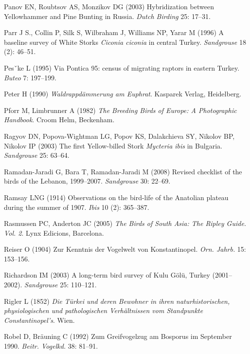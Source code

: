 \documentclass[
  letterpaper,
  DIV=11,
  numbers=noendperiod]{scrreprt}
\newlength{\cslhangindent}
\newenvironment{CSLReferences}[2] %
 {\begin{list}{}{%
  \setlength{\itemindent}{0pt}
  \setlength{\leftmargin}{0pt}
  \setlength{\parsep}{0pt}
  \ifodd #1
   \setlength{\leftmargin}{\cslhangindent}
   \setlength{\itemindent}{-1\cslhangindent}
  \fi
  \setlength{\itemsep}{#2\baselineskip}}}
 {\end{list}}
\begin{document}
\begin{CSLReferences}{0}{1}
Panov EN, Roubtsov AS, Monzikov DG (2003) {Hybridization between
Yellowhammer and Pine Bunting in Russia}. \emph{Dutch Birding} 25:
17--31.

Parr J S., Collin P, Silk S, Wilbraham J, Williams NP, Yarar M (1996) {A
baseline survey of White Storks \emph{Ciconia ciconia} in central
Turkey}. \emph{Sandgrouse} 18 (2): 46--51.

Pesˇke L (1995) {Via Pontica 95: census of migrating raptors in eastern
Turkey}. \emph{Buteo} 7: 197--199.

Peter H (1990) \emph{{Waldrappdämmerung am Euphrat}}. Kasparek Verlag,
Heidelberg.

Pforr M, Limbrunner A (1982) \emph{{The Breeding Birds of Europe: A
Photographic Handbook}}. Croom Helm, Beckenham.

Ragyov DN, Popova-Wightman LG, Popov KS, Dalakchieva SY, Nikolov BP,
Nikolov IP (2003) {The first Yellow-billed Stork \emph{Mycteria ibis} in
Bulgaria}. \emph{Sandgrouse} 25: 63--64.

Ramadan-Jaradi G, Bara T, Ramadan-Jaradi M (2008) {Revised checklist of
the birds of the Lebanon, 1999--2007}. \emph{Sandgrouse} 30: 22--69.

Ramsay LNG (1914) {Observations on the bird-life of the Anatolian
plateau during the summer of 1907}. \emph{Ibis} 10 (2): 365--387.

Rasmussen PC, Anderton JC (2005) \emph{{The Birds of South Asia: The
Ripley Guide. Vol. 2}}. Lynx Edicions, Barcelona.

Reiser O (1904) {Zur Kenntnis der Vogelwelt von Konstantinopel}.
\emph{Orn. Jahrb.} 15: 153--156.

Richardson IM (2003) {A long-term bird survey of Kulu Gölü, Turkey
(2001--2002)}. \emph{Sandgrouse} 25: 110--121.

Rigler L (1852) \emph{{Die Türkei und deren Bewohner in ihren
naturhistorischen, physiologischen und pathologischen Verhältnissen vom
Standpunkte Constantinopel's}}. Wien.

Robel D, Bräuning C (1992) {Zum Greifvogelzug am Bosporus im September
1990}. \emph{Beitr. Vogelkd.} 38: 81--91.


\end{CSLReferences}
\end{document}

